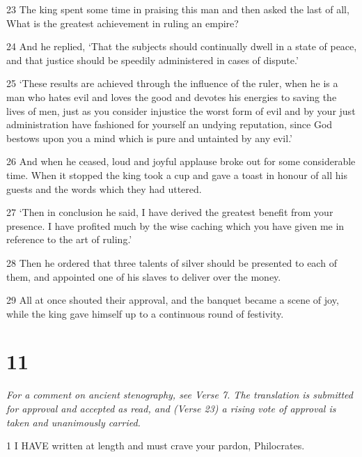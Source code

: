 \par 23 The king spent some time in praising this man and then asked the last of all, What is the greatest achievement in ruling an empire?

\par 24 And he replied, ‘That the subjects should continually dwell in a state of peace, and that justice should be speedily administered in cases of dispute.’

\par 25 ‘These results are achieved through the influence of the ruler, when he is a man who hates evil and loves the good and devotes his energies to saving the lives of men, just as you consider injustice the worst form of evil and by your just administration have fashioned for yourself an undying reputation, since God bestows upon you a mind which is pure and untainted by any evil.’

\par 26 And when he ceased, loud and joyful applause broke out for some considerable time. When it stopped the king took a cup and gave a toast in honour of all his guests and the words which they had uttered.

\par 27 ‘Then in conclusion he said, I have derived the greatest benefit from your presence. I have profited much by the wise caching which you have given me in reference to the art of ruling.’

\par 28 Then he ordered that three talents of silver should be presented to each of them, and appointed one of his slaves to deliver over the money.

\par 29 All at once shouted their approval, and the banquet became a scene of joy, while the king gave himself up to a continuous round of festivity.

\chapter{11}

\par \textit{For a comment on ancient stenography, see Verse 7. The translation is submitted for approval and accepted as read, and (Verse 23) a rising vote of approval is taken and unanimously carried.}

\par 1 I HAVE written at length and must crave your pardon, Philocrates.

